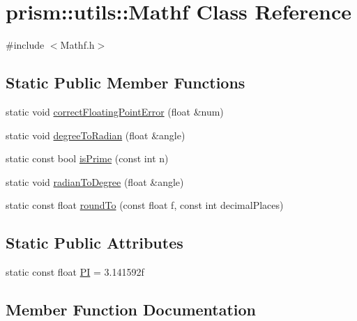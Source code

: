 \hypertarget{classprism_1_1utils_1_1_mathf}{}\section{prism\+:\+:utils\+:\+:Mathf Class Reference}
\label{classprism_1_1utils_1_1_mathf}


{\ttfamily \#include $<$Mathf.\+h$>$}

\subsection*{Static Public Member Functions}
\begin{DoxyCompactItemize}
\item 
static void \hyperlink{classprism_1_1utils_1_1_mathf_a6fe512675f5290ab6c7bad4a43d3b167}{correct\+Floating\+Point\+Error} (float \&num)
\item 
static void \hyperlink{classprism_1_1utils_1_1_mathf_a2283a2b424cc860e5c17e8c522c0420d}{degree\+To\+Radian} (float \&angle)
\item 
static const bool \hyperlink{classprism_1_1utils_1_1_mathf_a1e40227f5e8ead6e69e2ef22e9b4b58a}{is\+Prime} (const int n)
\item 
static void \hyperlink{classprism_1_1utils_1_1_mathf_a41202cd8a2b4137f64318ef6e39d6e9b}{radian\+To\+Degree} (float \&angle)
\item 
static const float \hyperlink{classprism_1_1utils_1_1_mathf_a7dfe7f182ab93f0768b83e628f590d75}{round\+To} (const float f, const int decimal\+Places)
\end{DoxyCompactItemize}
\subsection*{Static Public Attributes}
\begin{DoxyCompactItemize}
\item 
static const float \hyperlink{classprism_1_1utils_1_1_mathf_adf864feded39d563bcf0c5735592a314}{PI} = 3.\+141592f
\end{DoxyCompactItemize}


\subsection{Member Function Documentation}
